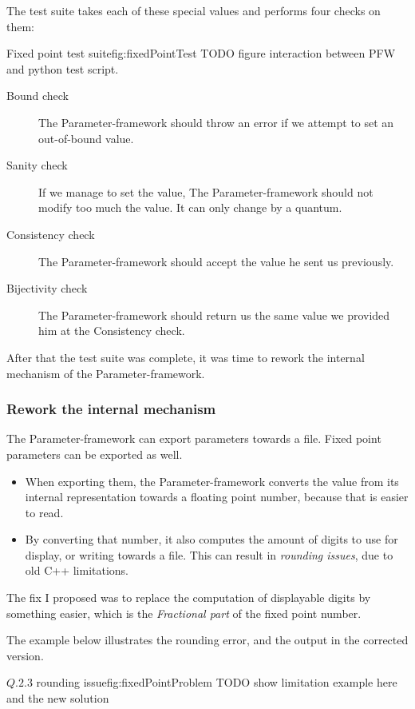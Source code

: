 The test suite takes each of these special values and performs four checks on
them:

\begin{figureGraphics}{Fixed point test suite}{fig:fixedPointTest}
    TODO figure interaction between PFW and python test script.
\end{figureGraphics}

\begin{description}
    \item[Bound check] The Parameter-framework should throw an error if we
        attempt to set an out-of-bound value.
    \item[Sanity check] If we manage to set the value, The Parameter-framework should not modify too much
        the value. It can only change by a quantum.
    \item[Consistency check] The Parameter-framework should accept the value he sent us previously.
    \item[Bijectivity check] The Parameter-framework should return us the same value we provided him at the Consistency check.
\end{description}

After that the test suite was complete, it was time to rework the internal
mechanism of the Parameter-framework.

\subsubsection{Rework the internal mechanism}
The Parameter-framework can export parameters towards a file. Fixed
point parameters can be exported as well.
\begin{itemize}
    \item When exporting them, the Parameter-framework converts the value from
        its internal representation towards a floating point number, because that is
        easier to read.
    \item By converting that number, it also computes the amount of digits
        to use for display, or writing towards a file. This can result in
        \emph{rounding issues}, due to old C++ limitations.
\end{itemize}
The fix I proposed was to replace the computation of displayable digits by something
easier, which is the \emph{Fractional part} of the fixed point number.

The example below illustrates the rounding error, and the output in the corrected version.
\begin{figureGraphics}{$Q.2.3$ rounding issue}{fig:fixedPointProblem}
    TODO show limitation example here and the new solution\\
\end{figureGraphics}


